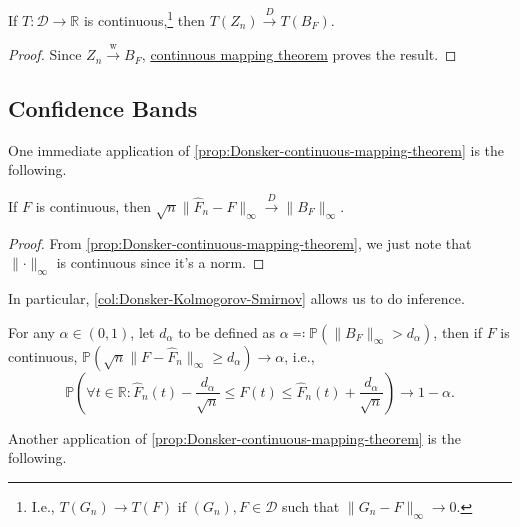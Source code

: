 \begin{proposition}\label{prop:Donsker-continuous-mapping-theorem}
	If \(T \colon \mathcal{D} \to \mathbb{R} \) is continuous,\footnote{I.e., \(T(G_n) \to T(F)\) if \((G_n), F \in \mathcal{D} \) such that \(\lVert G_n - F \rVert _\infty \to 0\).} then \(T(Z_n) \overset{D}{\to} T(B_F)\).
\end{proposition}
\begin{proof}
	Since \(Z_n \overset{\text{w} }{\to} B_F\), \hyperref[thm:continuous-mapping]{continuous mapping theorem} proves the result.
\end{proof}

\subsection{Confidence Bands}
One immediate application of \autoref{prop:Donsker-continuous-mapping-theorem} is the following.

\begin{corollary}\label{col:Donsker-Kolmogorov-Smirnov}
	If \(F\) is continuous, then \(\sqrt{n} \lVert \hat{F} _n - F \rVert _\infty \overset{D}{\to} \lVert B_F \rVert _\infty \).
\end{corollary}
\begin{proof}
	From \autoref{prop:Donsker-continuous-mapping-theorem}, we just note that \(\lVert \cdot \rVert _\infty \) is continuous since it's a norm.
\end{proof}

In particular, \autoref{col:Donsker-Kolmogorov-Smirnov} allows us to do inference.

\begin{eg}\label{eg:confidence-band-Kolmogorov-Smirnov}
	For any \(\alpha \in (0, 1)\), let \(d_\alpha \) to be defined as \(\alpha \eqqcolon \mathbb{P} (\lVert B_F \rVert _\infty > d_\alpha )\), then if \(F\) is continuous, \(\mathbb{P} (\sqrt{n} \lVert F - \hat{F} _n \rVert _\infty \geq d_\alpha ) \to \alpha\), i.e.,
	\[
		\mathbb{P} \left(\forall t \in \mathbb{R} \colon \hat{F} _n(t) - \frac{d_\alpha }{\sqrt{n} } \leq F(t) \leq \hat{F} _n(t) + \frac{d_\alpha }{\sqrt{n} } \right) \to 1 - \alpha .
	\]
\end{eg}

Another application of \autoref{prop:Donsker-continuous-mapping-theorem} is the following.

